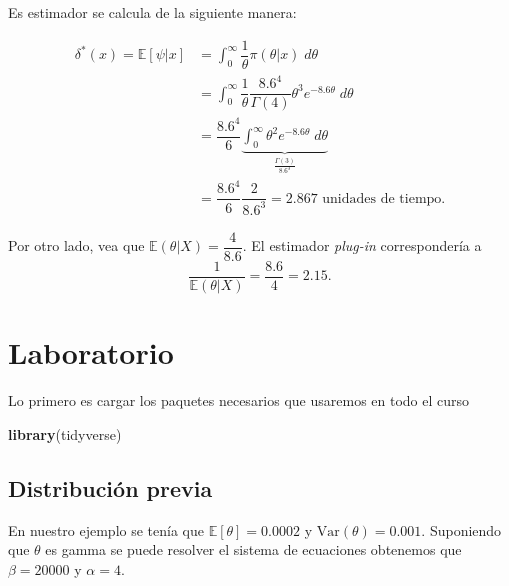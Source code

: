 \documentclass[
  12pt,
]{book}
\newenvironment{Shaded}{\begin{snugshade}}{\end{snugshade}}
\newcommand{\KeywordTok}[1]{\textcolor[rgb]{0.13,0.29,0.53}{\textbf{#1}}}
\newcommand{\NormalTok}[1]{#1}
\begin{document}
Es estimador se calcula de la siguiente manera:

\begin{align*}
\delta^*(x) = \mathbb{E}[\psi|x] & = \int_{0}^\infty \dfrac{1}\theta\pi(\theta|x)\;d\theta\\
& = \int_{0}^\infty \dfrac{1}\theta \dfrac{8.6^4}{\Gamma(4)} \theta^3e^{-8.6\theta}\;d\theta\\
&=\dfrac{8.6^4}{6} \underbrace{\int_{0}^\infty \theta^2 e^{-8.6\theta}\;d\theta}_{\frac{\Gamma(3)}{8.6^3}}\\
& = \dfrac{8.6^4}{6}\dfrac{2}{8.6^3} = 2.867 \text{ unidades de tiempo.}
\end{align*}

Por otro lado, vea que \(\mathbb{E}(\theta|X) = \dfrac{4}{8.6}\). El estimador \emph{plug-in} correspondería a
\[\dfrac{1}{\mathbb{E}(\theta|X)} = \dfrac{8.6}{4} = 2.15.\]

\hypertarget{laboratorio}{%
\section{Laboratorio}\label{laboratorio}}

Lo primero es cargar los paquetes necesarios que usaremos en todo el curso

\begin{Shaded}
\begin{Highlighting}[]
\KeywordTok{library}\NormalTok{(tidyverse)}
\end{Highlighting}
\end{Shaded}

\hypertarget{distribuciuxf3n-previa}{%
\subsection{Distribución previa}\label{distribuciuxf3n-previa}}

En nuestro ejemplo se tenía que \(\mathbb E [\theta] = 0.0002\) y \(\mathrm{Var}(\theta) = 0.001\). Suponiendo que \(\theta\) es gamma se puede resolver el sistema de ecuaciones obtenemos que \(\beta=20000\) y \(\alpha=4\).
\end{document}
